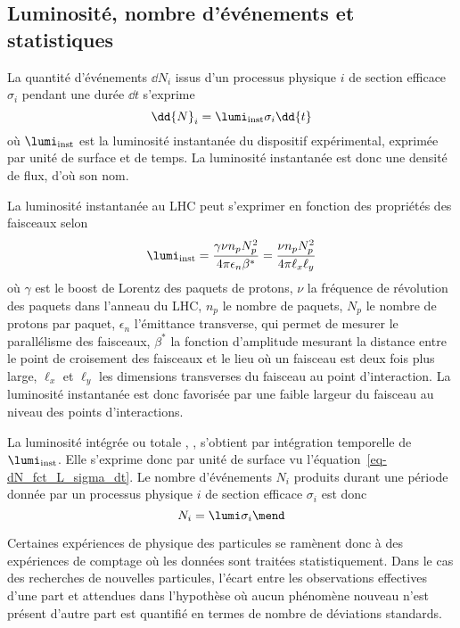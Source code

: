 \subsection{Luminosité, nombre d'événements et statistiques}\label{chapter-LHC-section-LHC-subsec-lumi}
La quantité d'événements $\dd{N}_i$ issus d'un processus physique $i$ de section efficace $\sigma_i$ pendant une durée $\dd{t}$ s'exprime
\begin{equation}
\dd{N}_i = \lumi_\text{inst} \sigma_i \dd{t}
\label{eq-dN_fct_L_sigma_dt}
\end{equation}
où $\lumi_\text{inst}$ est la luminosité instantanée du dispositif expérimental, exprimée par unité de surface et de temps.
La luminosité instantanée est donc une densité de flux, d'où son nom.
\par La luminosité instantanée au LHC peut s'exprimer en fonction des propriétés des faisceaux selon
\begin{equation}
\lumi_\text{inst}
= \frac{\gamma\nu n_p N_p^2}{4\pi\epsilon_n\beta^*}
= \frac{\nu n_p N_p^2}{4\pi\ell_x\ell_y}
\end{equation}
où
$\gamma$ est le boost de Lorentz des paquets de protons,
$\nu$ la fréquence de révolution des paquets dans l'anneau du LHC,
$n_p$ le nombre de paquets,
$N_p$ le nombre de protons par paquet,
$\epsilon_n$ l'émittance transverse, qui permet de mesurer le parallélisme des faisceaux,
$\beta^*$ la fonction d'amplitude mesurant la distance entre le point de croisement des faisceaux et le lieu où un faisceau est deux fois plus large,
$\ell_x$ et $\ell_y$ les dimensions transverses du faisceau au point d'interaction.
La luminosité instantanée est donc favorisée par une faible largeur du faisceau au niveau des points d'interactions.
\par
La luminosité intégrée ou \og totale \fg, \lumi, s'obtient par intégration temporelle de $\lumi_\text{inst}$.
Elle s'exprime donc par unité de surface vu l'équation~\eqref{eq-dN_fct_L_sigma_dt}.
Le nombre d'événements $N_i$ produits durant une période donnée par un processus physique $i$ de section efficace $\sigma_i$ est donc
\begin{equation}
N_i = \lumi \sigma_i
\mend
\end{equation}
\par Certaines expériences de physique des particules se ramènent donc à des expériences de comptage où les données sont traitées statistiquement.
Dans le cas des recherches de nouvelles particules, l'écart entre les observations effectives d'une part et attendues dans l'hypothèse où aucun phénomène nouveau n'est présent d'autre part est quantifié en termes de nombre de déviations standards.
